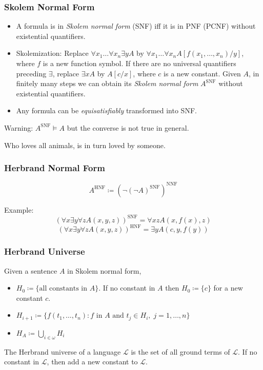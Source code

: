 \documentclass[UTF8,aspectratio=43,11pt,colorlinks,compress,openany]{beamer}%
\begin{document}
\begin{frame}\frametitle{Skolem Normal Form}
	\begin{itemize}
		\item A formula is in \emph{Skolem normal form} (SNF) iff it is in PNF (PCNF) without existential quantifiers. 
		\item Skolemization: Replace $\forall x_1\dots\forall x_n\exists y A$ by $\forall x_1\dots\forall x_n A[f(x_1,\dots,x_n)/y]$, where $f$ is a new function symbol. If there are no universal quantifiers preceding $\exists$, replace $\exists x A$ by $A[c/x]$, where $c$ is a new constant. Given $A$, in finitely many steps we can obtain its \emph{Skolem normal form} $A^{\mathrm{SNF}}$ without existential quantifiers.
		\item Any formula can be \emph{equisatisfiably} transformed into SNF.
	\end{itemize}
	Warning: $A^{\mathrm{SNF}}\vDash A$ but the converse is not true in general.
	\begin{exercise}
	Who loves all animals, is in turn loved by someone.
	\end{exercise}
\end{frame}

\begin{frame}\frametitle{Herbrand Normal Form}
	\begin{center}
		\[A^{\mathrm{HNF}}\coloneqq \left(\neg(\neg A)^{\mathrm{SNF}}\right)^{\mathrm{NNF}}\]
	\end{center}
	Example:
	\[(\forall x\exists y\forall z A(x,y,z))^{\mathrm{SNF}}=\forall xz A(x,f(x),z)\]
	\[(\forall x\exists y\forall z A(x,y,z))^{\mathrm{HNF}}=\exists y A(c,y,f(y))\]
\end{frame}

\begin{frame}\frametitle{Herbrand Universe}
\begin{definition}
Given a sentence $A$ in Skolem normal form,
\begin{itemize}
	\item $H_0\coloneqq \{\mbox{all constants in } A\}$. If no constant in $A$ then $H_0\coloneqq \{c\}$ for a new constant $c$.
	\item $H_{i+1}\coloneqq \big\{f(t_1,\dots,t_n): f \mbox{ in } A \mbox{ and } t_j\in H_i,\; j=1,\dots, n\big\}$
	\item $H_A\coloneqq \bigcup\limits_{i\in\omega}H_i$
\end{itemize}
\end{definition}
The Herbrand universe of a language $\mathscr{L}$ is the set of all ground terms of $\mathscr{L}$. If no constant in $\mathscr{L}$, then add a new constant to $\mathscr{L}$.
\end{frame}
\end{document}
